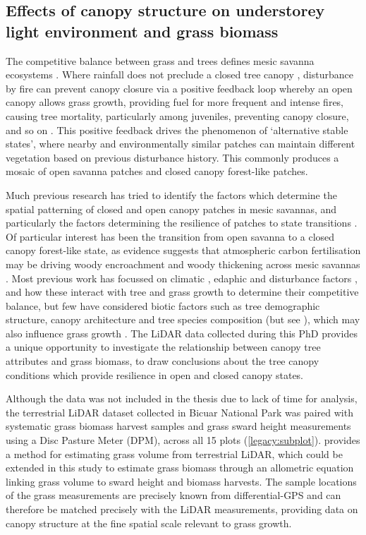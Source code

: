 \begin{refsection}
\subsection{Effects of canopy structure on understorey light environment and grass biomass}
\label{legacy:ssec:grass}

The competitive balance between grass and trees defines mesic savanna ecosystems \citep{Frost1996}. Where rainfall does not preclude a closed tree canopy \citep{Sankaran2005}, disturbance by fire can prevent canopy closure via a positive feedback loop whereby an open canopy allows grass growth, providing fuel for more frequent and intense fires, causing tree mortality, particularly among juveniles, preventing canopy closure, and so on \citep{Staver2011}. This positive feedback drives the phenomenon of `alternative stable states', where nearby and environmentally similar patches can maintain different vegetation based on previous disturbance history. This commonly produces a mosaic of open savanna patches and closed canopy forest-like patches. 

Much previous research has tried to identify the factors which determine the spatial patterning of closed and open canopy patches in mesic savannas, and particularly the factors determining the resilience of patches to state transitions \citep{Devine2017, Case2016, Hirota2011}. Of particular interest has been the transition from open savanna to a closed canopy forest-like state, as evidence suggests that atmospheric carbon fertilisation may be driving woody encroachment and woody thickening across mesic savannas \citep{Stevens2017}. Most previous work has focussed on climatic \citep{Case2020}, edaphic \citep{Colgan2012} and disturbance factors \citep{Case2016}, and how these interact with tree and grass growth to determine their competitive balance, but few have considered biotic factors such as tree demographic structure, canopy architecture and tree species composition (but see \citealt{Pilon2020}), which may also influence grass growth \citep{Jennings1999}. The LiDAR data collected during this PhD provides a unique opportunity to investigate the relationship between canopy tree attributes and grass biomass, to draw conclusions about the tree canopy conditions which provide resilience in open and closed canopy states.

Although the data was not included in the thesis due to lack of time for analysis, the terrestrial LiDAR dataset collected in Bicuar National Park was paired with systematic grass biomass harvest samples and grass sward height measurements using a Disc Pasture Meter (DPM), across all 15 plots (\autoref{legacy:subplot}). \citet{Cooper2017} provides a method for estimating grass volume from terrestrial LiDAR, which could be extended in this study to estimate grass biomass through an allometric equation linking grass volume to sward height and biomass harvests. The sample locations of the grass measurements are precisely known from differential-GPS and can therefore be matched precisely with the LiDAR measurements, providing data on canopy structure at the fine spatial scale relevant to grass growth. 


\end{refsection}
